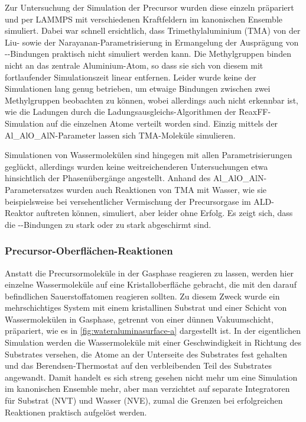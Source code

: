 Zur Untersuchung der Simulation der Precursor wurden diese einzeln präpariert und per LAMMPS mit verschiedenen Kraftfeldern im kanonischen Ensemble simuliert.
Dabei war schnell ersichtlich, dass Trimethylaluminium (TMA) von der Liu- sowie der Narayanan-Parametrisierung in Ermangelung der Ausprägung von --Bindungen praktisch nicht simuliert werden kann.
Die Methylgruppen binden nicht an das zentrale Aluminium-Atom, so dass sie sich von diesem mit fortlaufender Simulationszeit linear entfernen.
Leider wurde keine der Simulationen lang genug betrieben, um etwaige Bindungen zwischen zwei Methylgruppen beobachten zu können, wobei allerdings auch nicht erkennbar ist, wie die Ladungen durch die Ladungsausgleichs-Algorithmen der ReaxFF-Simulation auf die einzelnen Atome verteilt worden sind.
Einzig mittels der Al\_AlO\_AlN-Parameter lassen sich TMA-Moleküle simulieren.


Simulationen von Wassermolekülen sind hingegen mit allen Parametrisierungen geglückt, allerdings wurden keine weitreichenderen Untersuchungen etwa hinsichtlich der Phasenübergänge angestellt.
Anhand des Al\_AlO\_AlN-Parametersatzes wurden auch Reaktionen von TMA mit Wasser, wie sie beispielsweise bei versehentlicher Vermischung der Precursorgase im ALD-Reaktor auftreten können, simuliert, aber leider ohne Erfolg.
Es zeigt sich, dass die --Bindungen zu stark oder zu stark abgeschirmt sind.

\subsubsection{Precursor-Oberflächen-Reaktionen}

Anstatt die Precursormoleküle in der Gasphase reagieren zu lassen, werden hier einzelne Wassermoleküle auf eine Kristalloberfläche gebracht, die mit den darauf befindlichen Sauerstoffatomen reagieren sollten.
Zu diesem Zweck wurde ein mehrschichtiges System mit einem kristallinen Substrat und einer Schicht von Wassermolekülen in Gasphase, getrennt von einer dünnen Vakuumschicht, präpariert, wie es in \ref{fig:wateraluminasurface-a} dargestellt ist.
In der eigentlichen Simulation werden die Wassermoleküle mit einer Geschwindigkeit in Richtung des Substrates versehen, die Atome an der Unterseite des Substrates fest gehalten und das Berendsen-Thermostat auf den verbleibenden Teil des Substrates angewandt.
Damit handelt es sich streng gesehen nicht mehr um eine Simulation im kanonischen Ensemble mehr, aber man verzichtet auf separate Integratoren für Substrat (NVT) und Wasser (NVE), zumal die Grenzen bei erfolgreichen Reaktionen praktisch aufgelöst werden.


